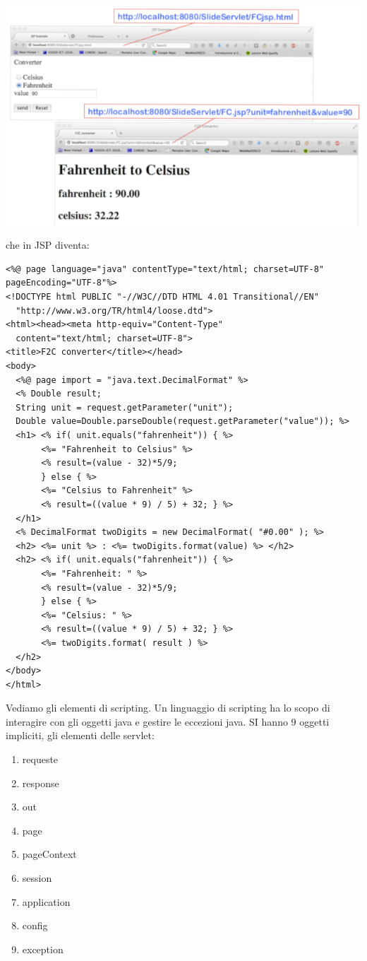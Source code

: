\message{ !name(sd.tex)}\documentclass[a4paper,12pt, oneside]{book}
\begin{document}
\begin{center}
	\includegraphics[scale=2.4]{img/jsp3.png}
\end{center}
\newpage
che in JSP diventa:
\begin{verbatim}
<%@ page language="java" contentType="text/html; charset=UTF-8" pageEncoding="UTF-8"%>
<!DOCTYPE html PUBLIC "-//W3C//DTD HTML 4.01 Transitional//EN" 
  "http://www.w3.org/TR/html4/loose.dtd">
<html><head><meta http-equiv="Content-Type" 
  content="text/html; charset=UTF-8">
<title>F2C converter</title></head>
<body>
  <%@ page import = "java.text.DecimalFormat" %>
  <% Double result;
  String unit = request.getParameter("unit");
  Double value=Double.parseDouble(request.getParameter("value")); %>
  <h1> <% if( unit.equals("fahrenheit")) { %>
       <%= "Fahrenheit to Celsius" %>
       <% result=(value - 32)*5/9;
       } else { %>
       <%= "Celsius to Fahrenheit" %> 
       <% result=((value * 9) / 5) + 32; } %>
  </h1>
  <% DecimalFormat twoDigits = new DecimalFormat( "#0.00" ); %>
  <h2> <%= unit %> : <%= twoDigits.format(value) %> </h2>
  <h2> <% if( unit.equals("fahrenheit")) { %>
       <%= "Fahrenheit: " %>
       <% result=(value - 32)*5/9;
       } else { %>
       <%= "Celsius: " %>
       <% result=((value * 9) / 5) + 32; } %>
       <%= twoDigits.format( result ) %>
  </h2>
</body>
</html>
\end{verbatim}
\newpage
Vediamo gli elementi di scripting. Un linguaggio di scripting ha lo scopo di interagire con gli oggetti java e gestire le eccezioni java. SI hanno 9 oggetti impliciti, gli elementi delle servlet:
\begin{enumerate}
	\item requeste
	\item response
	\item out
	\item page
	\item pageContext
	\item session
	\item application
	\item config
	\item exception
\end{enumerate}
\end{document}

